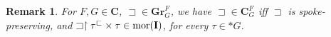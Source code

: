 \documentclass[12pt]{amsart}
\numberwithin{equation}{section}
\theoremstyle{plain}
\newtheorem{remark}[theorem]{\bf Remark}
\newtheorem{proposition}[theorem]{\bf Proposition}
\theoremstyle{definition}
\newcommand{\sqni}{\mathrel{\vphantom{\sqsupset}\text{\mathsurround=0pt\ooalign{$\sqsupset$\cr$-$\cr}}}}
\newcommand \sqsp{\sqsupset}
\newcommand \sqsb{\sqsubset}
\newcommand \mor{{\rm{mor}}}
\newcommand \rt{\mathbf{0}}
\newcommand \fra{Fra\"{i}ss\'{e}}
\newcommand \uhr{\upharpoonright}
\newcommand \CCb{\mathbf{C}}
\newcommand \GGRb{\mathbf{Gr}}
\newcommand \IIb{\mathbf{I}}
\newcommand \It{\mathtt{I}}
\begin{document}
 



%
\begin{remark}
For $F,G \in \CCb$, $\sqsp \in \GGRb^F_G$, we have $\sqsp \in \CCb^F_G$ iff $\sqsp$ is spoke-preserving, and $\sqsp \uhr \tau^\sqsb \times \tau \in \mor(\IIb)$, for every $\tau \in *G$. 
\end{remark}
%

\end{document}
